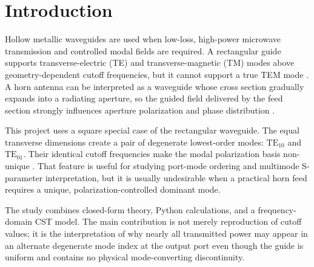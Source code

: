 \section{Introduction}
\label{sec:introduction}

Hollow metallic waveguides are used when low-loss, high-power microwave transmission and controlled modal fields are required. A rectangular guide supports transverse-electric (TE) and transverse-magnetic (TM) modes above geometry-dependent cutoff frequencies, but it cannot support a true TEM mode \cite{pozar2011microwave}. A horn antenna can be interpreted as a waveguide whose cross section gradually expands into a radiating aperture, so the guided field delivered by the feed section strongly influences aperture polarization and phase distribution \cite{stutzman2013antenna}.

This project uses a square special case of the rectangular waveguide. The equal transverse dimensions create a pair of degenerate lowest-order modes: \(\mathrm{TE}_{10}\) and \(\mathrm{TE}_{01}\). Their identical cutoff frequencies make the modal polarization basis non-unique \cite{pozar2011microwave}. That feature is useful for studying port-mode ordering and multimode S-parameter interpretation, but it is usually undesirable when a practical horn feed requires a unique, polarization-controlled dominant mode.

The study combines closed-form theory, Python calculations, and a frequency-domain CST model. The main contribution is not merely reproduction of cutoff values; it is the interpretation of why nearly all transmitted power may appear in an alternate degenerate mode index at the output port even though the guide is uniform and contains no physical mode-converting discontinuity.
